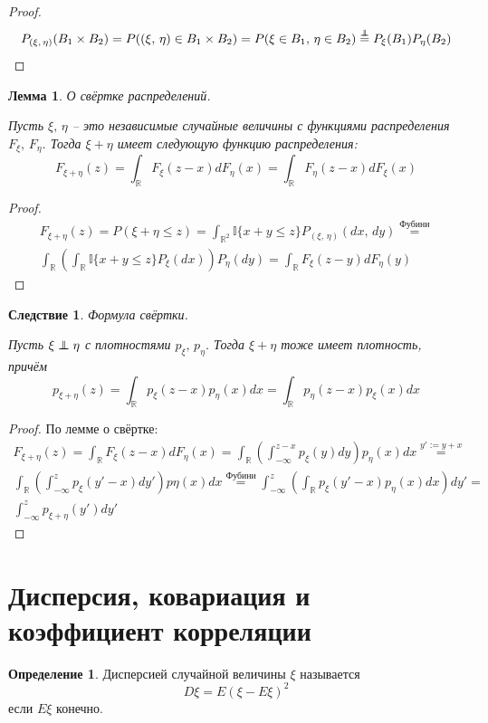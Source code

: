 \documentclass[a4paper,12pt]{article}
\renewcommand{\leq}{\ensuremath{\leqslant}}
\newcommand\independent{\protect\mathpalette{\protect\independenT}{\perp}}
\def\independenT#1#2{\mathrel{\rlap{$#1#2$}\mkern2mu{#1#2}}}
\theoremstyle{plain}
\newtheorem{lemma}{Лемма}[section]
\newtheorem*{corollary}{Следствие}
\theoremstyle{definition}
\newtheorem{definition}{Определение}[section]
\theoremstyle{remark}
\begin{document}
\begin{proof}
	\[
		P_{(\xi,\,\eta)}(B_1 \times B_2) = P((\xi,\,\eta) \in B_1 \times B_2) = P(\xi \in B_1,\, \eta \in B_2) \stackrel{\independent}{=} P_\xi(B_1)P_\eta(B_2)
	\]
\end{proof}

\begin{lemma}
	О свёртке распределений.

	Пусть $\xi,\, \eta$ -- это независимые случайные величины с функциями распределения $F_\xi,\, F_\eta$. Тогда $\xi + \eta$ имеет следующую функцию распределения:
	\[F_{\xi + \eta}(z) = \int_\mathbb{R}F_\xi(z - x)dF_\eta(x) = \int_\mathbb{R}F_\eta(z - x)dF_\xi(x)\]
\end{lemma}

\begin{proof}
	\begin{align*}
		F_{\xi + \eta}(z) = P(\xi + \eta \leq z) = \int_{\mathbb{R}^2}\mathbb{I}\{x + y \leq z\}P_{(\xi,\,\eta)}(dx,\, dy) \stackrel{\text{Фубини}}{=} \\
		\int_\mathbb{R}\left(\int_\mathbb{R}\mathbb{I}\{x + y \leq z\}P_\xi(dx)\right)P_\eta(dy) = \int_\mathbb{R} F_\xi(z - y)dF_\eta(y)
	\end{align*}
\end{proof}

\begin{corollary}
	Формула свёртки.

	Пусть $\xi \independent \eta$ с плотностями $p_\xi,\, p_\eta$. Тогда $\xi + \eta$ тоже имеет плотность, причём
	\[p_{\xi + \eta}(z) = \int_\mathbb{R}p_\xi(z - x)p_\eta(x)dx = \int_\mathbb{R} p_\eta(z - x)p_\xi(x)dx\]
\end{corollary}

\begin{proof}
	По лемме о свёртке:
	\begin{align*}
		F_{\xi + \eta}(z) = \int_\mathbb{R}F_\xi(z - x)dF_\eta(x) = \int_\mathbb{R}\left(\int_{-\infty}^{z - x}p_\xi(y)dy\right)p_\eta(x)dx \stackrel{y' := y + x}{=}                   \\
		\int_\mathbb{R} \left(\int_{-\infty}^z p_\xi(y' - x)dy'\right)p\eta(x)dx \stackrel{\text{Фубини}}{=} \int_{-\infty}^z \left(\int_\mathbb{R}p_\xi(y' - x)p_\eta(x)dx\right)dy' = \\
		\int_{-\infty}^z p_{\xi + \eta}(y')dy'
	\end{align*}
\end{proof}

\section{Дисперсия, ковариация и коэффициент корреляции}
\begin{definition}
	Дисперсией случайной величины $\xi$ называется
	\[D\xi = E(\xi - E\xi)^2\]
	если $E\xi$ конечно.
\end{definition}
\end{document}
